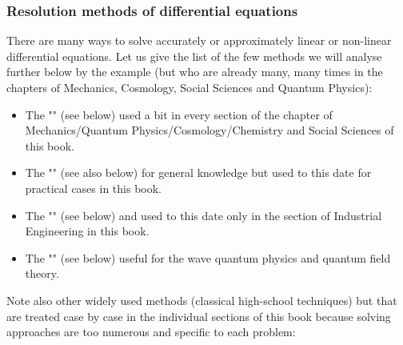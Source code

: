 	\subsubsection{Resolution methods of differential equations}
	There are many ways to solve accurately or approximately linear or non-linear differential equations. Let us give the list of the few methods we will analyse further below by the example (but who are already many, many times in the chapters of Mechanics, Cosmology, Social Sciences and Quantum Physics):
	\begin{itemize}
		\item The "" (see below) used a bit in every section of the chapter of Mechanics/Quantum Physics/Cosmology/Chemistry and Social Sciences of this book.
		
		\item The "" (see also below) for general knowledge but used to this date for practical cases in this book.
		
		\item The "" (see below) and used to this date only in the section of Industrial Engineering in this book.
		
		\item The "" (see below) useful for the wave quantum physics and quantum field theory.
	\end{itemize}
	
	Note also other widely used methods (classical high-school techniques) but that are treated case by case in the individual sections of this book because solving approaches are too numerous and specific to each problem:
	
